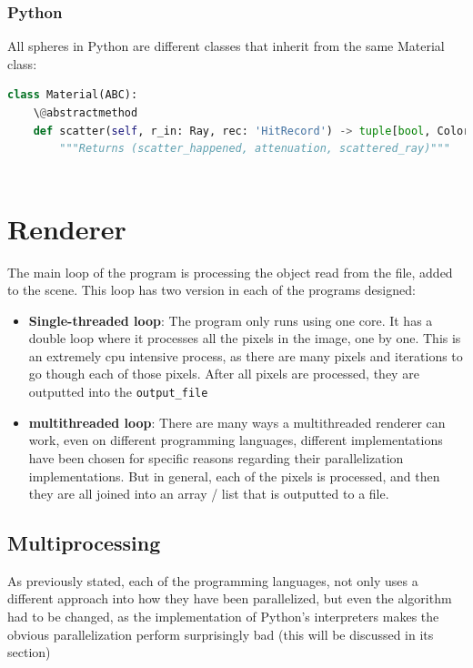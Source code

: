 \subsubsection{Python}
All spheres in Python are different classes that inherit from the same Material class:
\begin{lstlisting}[language=Python, caption={Python abscract class.}, label={lst:python_material_abstract}]
class Material(ABC):
    \@abstractmethod
    def scatter(self, r_in: Ray, rec: 'HitRecord') -> tuple[bool, Color, Ray]:
        """Returns (scatter_happened, attenuation, scattered_ray)"""
        
\end{lstlisting}
    


\section{Renderer}
\label{sec:renderer}
The main loop of the program is processing the object read from the file, added to the scene. 
This loop has two version in each of the programs designed:
\begin{itemize}
    \item \textbf{Single-threaded loop}: The program only runs using one core. It has a double loop where it processes all the pixels in the image, one by one. This is an extremely \gls{cpu} intensive process, as there are many pixels and iterations to go though each of those pixels. After all pixels are processed, they are outputted into the \texttt{output\_file}
    
    \item \textbf{multithreaded loop}: There are many ways a multithreaded renderer can work, even on different programming languages, different implementations have been chosen for specific reasons regarding their parallelization implementations. But in general, each of the pixels is processed, and then they are all joined into an array / list that is outputted to a file.
\end{itemize}


\subsection{Multiprocessing}
As previously stated, each of the programming languages, not only uses a different approach into how they have been parallelized, but even the algorithm had to be changed, as the implementation of Python's interpreters makes the obvious parallelization perform surprisingly bad (this will be discussed in its section)


